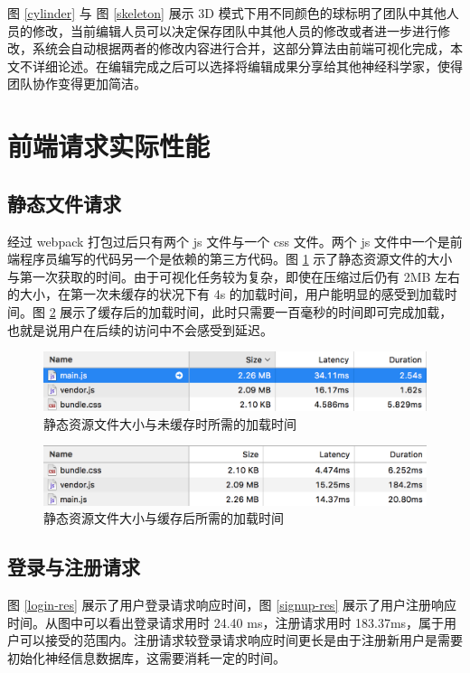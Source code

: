 图 \ref{cylinder} 与 图 \ref{skeleton} 展示 3D 模式下用不同颜色的球标明了团队中其他人员的修改，当前编辑人员可以决定保存团队中其他人员的修改或者进一步进行修改，系统会自动根据两者的修改内容进行合并，这部分算法由前端可视化完成，本文不详细论述。在编辑完成之后可以选择将编辑成果分享给其他神经科学家，使得团队协作变得更加简洁。

\section{前端请求实际性能}
\subsection{静态文件请求}
经过 webpack 打包过后只有两个 js 文件与一个 css 文件。两个 js 文件中一个是前端程序员编写的代码另一个是依赖的第三方代码。图 \ref{file-nocache} 示了静态资源文件的大小与第一次获取的时间。由于可视化任务较为复杂，即使在压缩过后仍有 2MB 左右的大小，在第一次未缓存的状况下有 4s 的加载时间，用户能明显的感受到加载时间。图 \ref{file-cache} 展示了缓存后的加载时间，此时只需要一百毫秒的时间即可完成加载，也就是说用户在后续的访问中不会感受到延迟。 

\begin{figure}[!ht]
\centering
\includegraphics[width=148mm]{images/file-nocache}
\caption{静态资源文件大小与未缓存时所需的加载时间}
\label{file-nocache}
\end{figure}

\begin{figure}[!ht]
\centering
\includegraphics[width=148mm]{images/file-cache}
\caption{静态资源文件大小与缓存后所需的加载时间}
\label{file-cache}
\end{figure}

\subsection{登录与注册请求}
图 \ref{login-res} 展示了用户登录请求响应时间，图 \ref{signup-res} 展示了用户注册响应时间。从图中可以看出登录请求用时 24.40 ms，注册请求用时 183.37ms，属于用户可以接受的范围内。注册请求较登录请求响应时间更长是由于注册新用户是需要初始化神经信息数据库，这需要消耗一定的时间。

